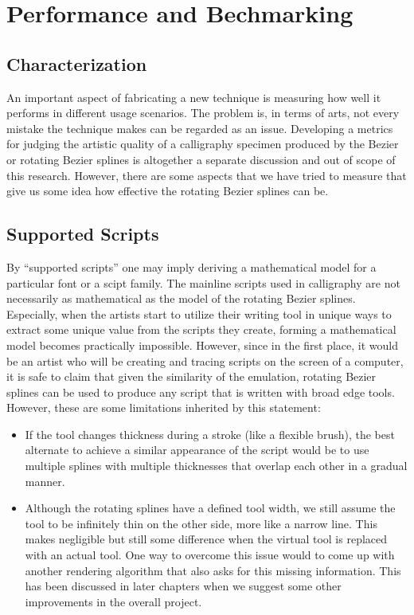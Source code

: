 \section{Performance and Bechmarking}
\label{Chapter:Performance}

\subsection{Characterization}
An important aspect of fabricating a new technique is measuring how well it performs in different usage scenarios. The problem is, in terms of arts, not every mistake the technique makes can be regarded as an issue. Developing a metrics for judging the artistic quality of a calligraphy specimen produced by the Bezier or rotating Bezier splines is altogether a separate discussion and out of scope of this research. However, there are some aspects that we have tried to measure that give us some idea how effective the rotating Bezier splines can be.

\subsection{Supported Scripts}
By ``supported scripts'' one may imply deriving a mathematical model for a particular font or a scipt family. The mainline scripts used in calligraphy are not necessarily as mathematical as the model of the rotating Bezier splines. Especially, when the artists start to utilize their writing tool in unique ways to extract some unique value from the scripts they create, forming a mathematical model becomes practically impossible. However, since in the first place, it would be an artist who will be creating and tracing scripts on the screen of a computer, it is safe to claim that given the similarity of the emulation, rotating Bezier splines can be used to produce any script that is written with broad edge tools. However, these are some limitations inherited by this statement:

\begin{itemize}
\item If the tool changes thickness during a stroke (like a flexible brush), the best alternate to achieve a similar appearance of the script would be to use multiple splines with multiple thicknesses that overlap each other in a gradual manner.
\item Although the rotating splines have a defined tool width, we still assume the tool to be infinitely thin on the other side, more like a narrow line. This makes negligible but still some difference when the virtual tool is replaced with an actual tool. One way to overcome this issue would to come up with another rendering algorithm that also asks for this missing information. This has been discussed in later chapters when we suggest some other improvements in the overall project.
\end{itemize}

